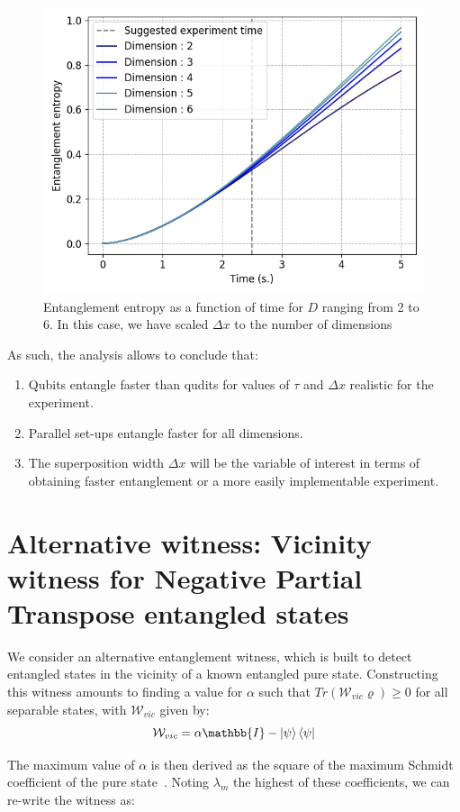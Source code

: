 \documentclass[%
 12pt,
 superscriptaddress,
 amsmath,
 amssymb,
 onecolumn,
 longbibliography
]{revtex4-2}
\begin{document}
\begin{appendices}
	\begin{figure}
	\centering
		\includegraphics[width=0.5\columnwidth]{para_qudits_scaling.png}
	    \caption{Entanglement entropy as a function of time for $D$ ranging from 2 to 6. In this case, we have scaled $\Delta x$ to the number of dimensions} \label{fig:scaling}
	\end{figure}

As such, the analysis allows to conclude that: 
	\begin{enumerate}
		\item Qubits entangle faster than qudits for values of $\tau$ and $\Delta x$ realistic for the experiment.
		\item Parallel set-ups entangle faster for all dimensions.
		\item The superposition width $\Delta x$ will be the variable of interest in terms of obtaining faster entanglement or a more easily implementable experiment.
	\end{enumerate}
	

\section{Alternative witness: Vicinity witness for Negative Partial Transpose entangled states} \hfill \break

\indent We consider an alternative entanglement witness, which is built to detect entangled states in the vicinity of a known entangled pure state. Constructing this witness amounts to finding a value for $\alpha$ such that $ Tr(\mathcal{W}_{vic}\varrho)\geqslant0$ for all separable states, with $\mathcal{W}_{vic}$ given by:
		\begin{equation}
			\mathcal{W}_{vic}=\alpha\mathbb{I} - \Ket{\psi}\Bra{\psi}
		\end{equation}

\indent The maximum value of $\alpha$ is then derived as the square of the maximum Schmidt coefficient of the pure state~\cite{Bourennane2004}. Noting $\lambda_m$ the highest of these coefficients, we can re-write the witness as:


\end{appendices}
\end{document}
